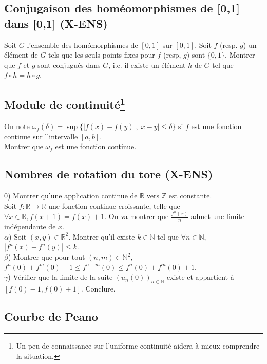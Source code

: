 \documentclass{article}
\begin{document}
\subsection{Conjugaison des hom\'eomorphismes de [0,1] dans [0,1] (X-ENS)}
Soit $G$ l'ensemble des hom\'omorphismes de $[0,1]$ sur $[0,1]$. Soit $f$ (resp. $g$) un \'el\'ement de $G$ tels que les seuls points fixes pour $f$ (resp, $g$) sont $\{0,1\}$. Montrer que $f$ et $g$ sont conjugu\'es dans $G$, i.e. il existe un \'el\'ement $h$ de $G$ tel que $f\circ h=h\circ g$.

\subsection{Module de continuit\'e\protect\footnote{Un peu de connaissance sur l'uniforme continuit\'e aidera \`a mieux comprendre la situation.}}
On note $\omega_{f}(\delta)=\sup\{|f(x)-f(y)|, |x-y|\leq\delta\}$ si $f$ est une fonction continue sur l'intervalle $[a,b]$.\\
Montrer que $\omega_{f}$ est une fonction continue.

\subsection{Nombres de rotation du tore (X-ENS)}
0) Montrer qu'une application continue de $\mathbb{R}$ vers $\mathbb{Z}$ est constante.\\
Soit $f:\mathbb{R}\to\mathbb{R}$ une fonction continue croissante, telle que $\forall x\in\mathbb{R}, f(x+1)=f(x)+1$. On va montrer que $\frac{f^n(x)}{n}$ admet une limite ind\'ependante de $x$.\\
$\alpha$) Soit $(x,y)\in\mathbb{R}^2$. Montrer qu'il existe $k\in\mathbb{N}$ tel que $\forall n\in\mathbb{N}$, $|f^n(x)-f^n(y)|\leq k$.\\
$\beta$)  Montrer que pour tout $(n,m)\in\mathbb{N}^2$, $f^n(0)+f^m(0)-1\leq f^{n+m}(0)\leq f^n(0)+f^m(0)+1$.\\
$\gamma$) V\'erifier que la limite de la suite $(u_n(0))_{n\in\mathbb{N}}$ existe et appartient \`a $[f(0)-1,f(0)+1]$. Conclure. 

\subsection{Courbe de Peano}
\end{document}
